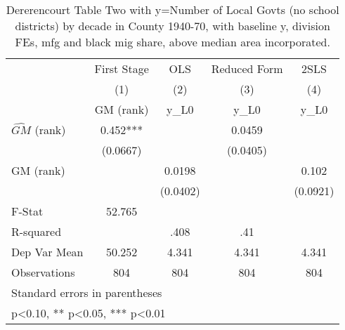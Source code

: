 \begin{table}[htbp]\centering
\def\sym#1{\ifmmode^{#1}\else\(^{#1}\)\fi}
\caption{Dererencourt Table Two with y=Number of Local Govts (no school districts) by decade in County 1940-70, with baseline y, division FEs, mfg and black mig share, above median area incorporated.}
\begin{tabular}{l*{4}{c}}
\toprule
                    & First Stage   &         OLS   &Reduced Form   &        2SLS   \\
                    &\multicolumn{1}{c}{(1)}&\multicolumn{1}{c}{(2)}&\multicolumn{1}{c}{(3)}&\multicolumn{1}{c}{(4)}\\
                    &\multicolumn{1}{c}{GM  (rank)}&\multicolumn{1}{c}{y\_L0}&\multicolumn{1}{c}{y\_L0}&\multicolumn{1}{c}{y\_L0}\\
\midrule
$\hat{GM}$ (rank)   &       0.452***&               &      0.0459   &               \\
                    &    (0.0667)   &               &    (0.0405)   &               \\
\addlinespace
GM  (rank)          &               &      0.0198   &               &       0.102   \\
                    &               &    (0.0402)   &               &    (0.0921)   \\
\midrule
F-Stat              &      52.765   &               &               &               \\
R-squared           &               &        .408   &         .41   &               \\
Dep Var Mean        &      50.252   &       4.341   &       4.341   &       4.341   \\
Observations        &         804   &         804   &         804   &         804   \\
\bottomrule
\multicolumn{5}{l}{\footnotesize Standard errors in parentheses}\\
\multicolumn{5}{l}{\footnotesize * p<0.10, ** p<0.05, *** p<0.01}\\
\end{tabular}
\end{table}
